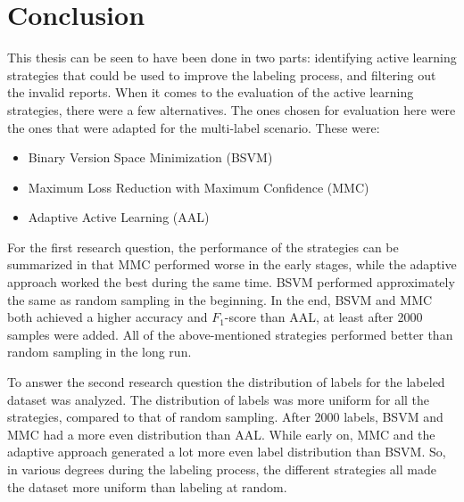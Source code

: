 
\chapter{Conclusion}
\label{cha:conclusion}

This thesis can be seen to have been done in two parts: identifying active learning strategies that could be used to improve the labeling process, and filtering out the invalid reports.
When it comes to the evaluation of the active learning strategies, there were a few alternatives.
The ones chosen for evaluation here were the ones that were adapted for the multi-label scenario.
These were: 
\begin{itemize}
    \item Binary Version Space Minimization (BSVM)
    \item Maximum Loss Reduction with Maximum Confidence (MMC)
    \item Adaptive Active Learning (AAL)
\end{itemize}

For the first research question, the performance of the strategies can be summarized in that MMC performed worse in the early stages, while the adaptive approach worked the best during the same time.
BSVM performed approximately the same as random sampling in the beginning.
In the end, BSVM and MMC both achieved a higher accuracy and $F_1$-score than AAL, at least after 2000 samples were added.
All of the above-mentioned strategies performed better than random sampling in the long run.

To answer the second research question the distribution of labels for the labeled dataset was analyzed.
The distribution of labels was more uniform for all the strategies, compared to that of random sampling.
After 2000 labels, BSVM and MMC had a more even distribution than AAL.
While early on, MMC and the adaptive approach generated a lot more even label distribution than BSVM.
So, in various degrees during the labeling process, the different strategies all made the dataset more uniform than labeling at random.

